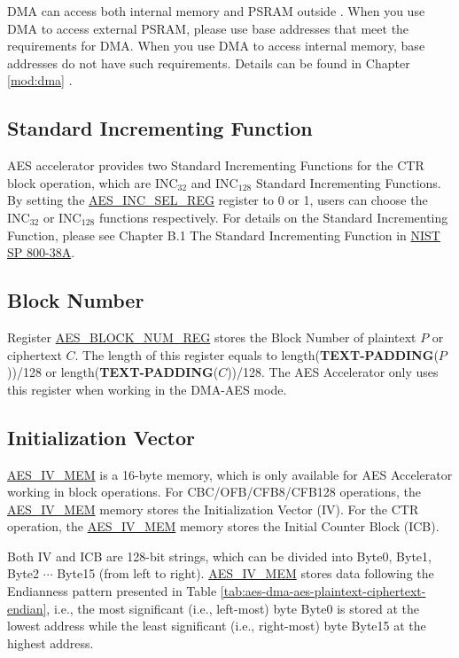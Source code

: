 \documentclass[main\_\_EN.tex]{subfiles}
\begin{document}
DMA can access both internal memory and PSRAM outside \chipname{}. When you use DMA to access external PSRAM, please use base addresses that meet the requirements for DMA. When you use DMA to access internal memory,  base addresses do not have such requirements. Details can be found in Chapter \ref{mod:dma} \textit{}.


\subsection{Standard Incrementing Function}\label{sec:aes-Standard-Incrementing-Function}

AES accelerator provides two Standard Incrementing Functions for the CTR block operation, which are INC$_{32}$ and INC$_{128}$ Standard Incrementing Functions. By setting the  \hyperref[regdesc:AESINCSELREG]{AES\_INC\_SEL\_REG} register to 0 or 1, users can choose the INC$_{32}$ or INC$_{128}$ functions respectively. For details on the Standard Incrementing Function, please see Chapter B.1 The Standard Incrementing Function in \href{https://nvlpubs.nist.gov/nistpubs/Legacy/SP/nistspecialpublication800-38a.pdf}{NIST SP 800-38A}.

\subsection{ Block Number}\label{sec:aes-block-number}

Register \hyperref[regdesc:AESBLOCKNUMREG]{AES\_BLOCK\_NUM\_REG} stores the Block Number of plaintext $P$ or ciphertext $C$. The length of this register equals to length({\bfseries TEXT-PADDING}($P$))/128 or length({\bfseries TEXT-PADDING}($C$))/128. The AES Accelerator only uses this register when working in the DMA-AES mode.

\subsection{Initialization Vector}\label{sec:aes-init-vector}

\label{memdesc:AESIVMEM}\hyperref[memdesc:AESIVMEM]{AES\_IV\_MEM} is a 16-byte memory, which is only available for AES Accelerator working in block operations. For CBC/OFB/CFB8/CFB128 operations, the \hyperref[memdesc:AESIVMEM]{AES\_IV\_MEM} memory stores the Initialization Vector (IV). For the CTR operation, the \hyperref[memdesc:AESIVMEM]{AES\_IV\_MEM} memory stores the Initial Counter Block (ICB).

Both IV and ICB are 128-bit strings, which can be divided into Byte0, Byte1, Byte2 \begin{math}\cdots\end{math} Byte15 (from left to right). \hyperref[memdesc:AESIVMEM]{AES\_IV\_MEM} stores data following the Endianness pattern presented in Table \ref{tab:aes-dma-aes-plaintext-ciphertext-endian}, i.e., the most significant (i.e., left-most) byte Byte0 is stored at the lowest address while the least significant (i.e., right-most) byte Byte15 at the highest address.
\end{document}
